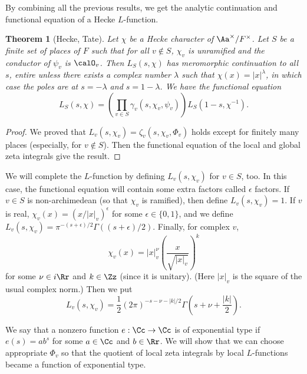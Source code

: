 \documentclass{article}
\newtheorem{theorem}{Theorem}[section]
\begin{document}
By combining all the previous results, we get the analytic continuation and functional equation of a Hecke $L$-function. 
\begin{theorem}[Hecke, Tate]
Let  $\chi$ be a Hecke character of $\Aa^{\times}/F^{\times}$. Let $S$ be a finite set of places of $F$ such that for all $v\not\in S$, $\chi_{v}$ is unramified and the conductor of $\psi_{v}$ is $\calO_{v}$. 
Then $L_{S}(s, \chi)$ has meromorphic continuation to all $s$, entire unless there exists a complex number $\lambda$ such that $\chi(x) = |x|^{\lambda}$, in which case the poles are at $s =- \lambda$ and $s = 1-\lambda$. We have the functional equation
$$
L_{S}(s, \chi) = \left( \prod_{v\in S} \gamma_{v}(s, \chi_{v}, \psi_{v})\right) L_{S}(1-s, \chi^{-1}). 
$$
\end{theorem}
\begin{proof}
We proved that $L_{v}(s, \chi_{v}) = \zeta_{v}(s, \chi_{v}, \Phi_{v})$ holds except for finitely many places (especially, for $v\not\in S$). Then the functional equation of the local and global zeta integrals give the result.  
\end{proof}

We will complete the $L$-function by defining $L_{v}(s, \chi_{v})$ for $v\in S$, too. 
In this case, the functional equation will contain some extra factors called $\epsilon$ factors. 
If $v\in S$ is non-archimedean (so that $\chi_{v}$ is ramified), then define $L_{v}(s, \chi_{v}) = 1$. 
If $v$ is real, $\chi_{v}(x) = (x/|x|_{v})^{\epsilon}$ for some $\epsilon \in \{0, 1\}$, and we define $L_{v}(s, \chi_{v}) = \pi^{-(s+\epsilon)/2}\Gamma((s+\epsilon)/2)$. 
Finally, for complex $v$, 
$$
\chi_{v}(x) = |x|_{v}^{\nu} \left( \frac{x}{\sqrt{|x|_{v}}}\right)^{k}
$$
for some $\nu\in i\Rr$ and $k\in \Zz$ (since it is unitary). (Here $|x|_{v}$ is the square of the usual complex norm.) Then we put
$$
L_{v}(s, \chi_{v}) = \frac{1}{2}(2\pi)^{-s-\nu-|k|/2} \Gamma\left( s + \nu + \frac{|k|}{2}\right).
$$

We say that a nonzero function $e:\Cc\to \Cc$ is of exponential type if $e(s) = ab^{s}$ for some $a\in \Cc$ and $b\in\Rr$. We will show that we can choose appropriate $\Phi_{v}$ so that the quotient of local zeta integrals by local $L$-functions became a function of exponential type. 
\end{document}
